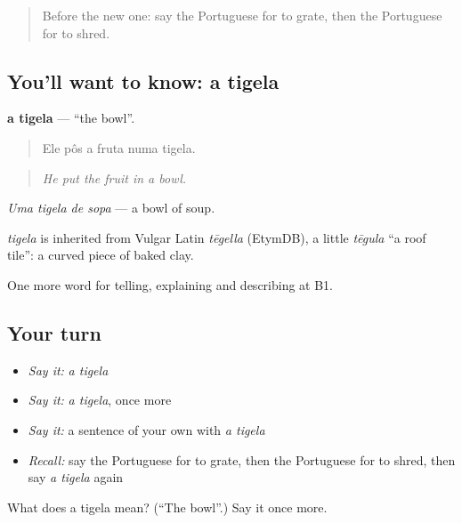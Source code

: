\label{lesson:PT-C330-tigela}



\begin{quote}
Before the new one: say the Portuguese for to grate, then the Portuguese for to shred.
\end{quote}

\subsection*{You'll want to know: a tigela}
\textbf{a tigela} — \textquotedblleft{}the bowl\textquotedblright{}.

\begin{quote}
Ele pôs a fruta numa tigela.
\end{quote}

\begin{quote}
\emph{He put the fruit in a bowl.}
\end{quote}

\emph{Uma tigela de sopa} — a bowl of soup.

\begin{cousinweb}
\emph{tigela} is inherited from Vulgar Latin \emph{tēgella} (EtymDB), a little \emph{tēgula} \textquotedblleft{}a roof tile\textquotedblright{}: a curved piece of baked clay.
\end{cousinweb}

\begin{grammarlens}[title={What you've built}]
One more word for telling, explaining and describing at B1.
\end{grammarlens}

\subsection*{Your turn}
\begin{itemize}
\raggedright
  \item \emph{Say it:} \emph{a tigela}
  \item \emph{Say it:} \emph{a tigela}, once more
  \item \emph{Say it:} a sentence of your own with \emph{a tigela}
  \item \emph{Recall:} say the Portuguese for to grate, then the Portuguese for to shred, then say \emph{a tigela} again
\end{itemize}

\begin{tcolorbox}[breakable,colback=teal!4,colframe=teal!35!black,title={Before you move on}]
What does a tigela mean? (\textquotedblleft{}The bowl\textquotedblright{}.) Say it once more.
\end{tcolorbox}
